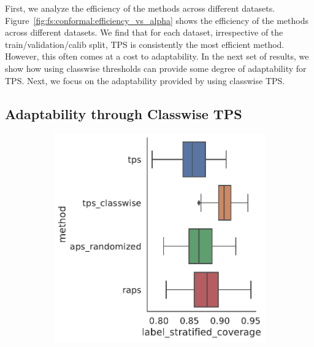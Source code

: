 First, we analyze the efficiency of the methods across different datasets.
Figure~\ref{fig:fs:conformal:efficiency_vs_alpha} shows the efficiency of the methods across different datasets.
We find that for each dataset, irrespective of the train/validation/calib split, TPS is consistently the most efficient method.
However, this often comes at a cost to adaptability.
In the next set of results, we show how using classwise thresholds can provide some degree of adaptability for TPS.
Next, we focus on the adaptability provided by using classwise TPS.

\subsection{Adaptability through Classwise TPS}
\begin{figure}
    \centering
    \begin{subfigure}{0.48\linewidth}
    \includegraphics[width=\linewidth,alt={Box plots for method comparison on CiteSeer dataset label stratified coverage.}]{graphConformal/figures/split/citeseer_label_stratified_coverage.png}
    \end{subfigure}
    \begin{subfigure}{0.48\linewidth}

\end{subfigure}
\end{figure}
